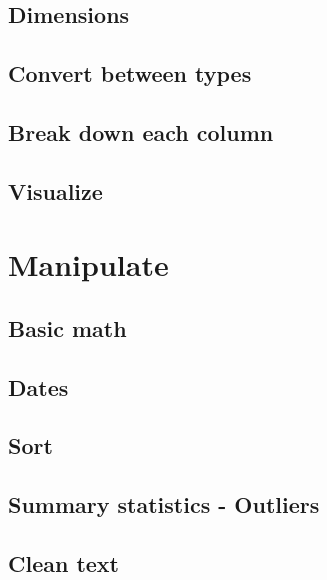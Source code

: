 \documentclass[
]{book}
\begin{document}
\hypertarget{dimensions}{%
\section{Dimensions}\label{dimensions}}

\hypertarget{convert-between-types}{%
\section{Convert between types}\label{convert-between-types}}

\hypertarget{break-down-each-column}{%
\section{Break down each column}\label{break-down-each-column}}

\hypertarget{visualize}{%
\section{Visualize}\label{visualize}}

\hypertarget{manipulate}{%
\chapter{Manipulate}\label{manipulate}}

\hypertarget{basic-math}{%
\section{Basic math}\label{basic-math}}

\hypertarget{dates}{%
\section{Dates}\label{dates}}

\hypertarget{sort}{%
\section{Sort}\label{sort}}

\hypertarget{summary-statistics---outliers}{%
\section{Summary statistics - Outliers}\label{summary-statistics---outliers}}

\hypertarget{clean-text}{%
\section{Clean text}\label{clean-text}}
\end{document}
